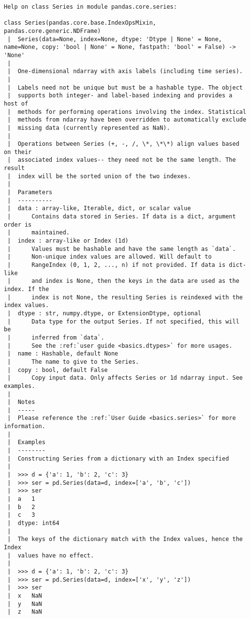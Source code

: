\documentclass[
  letterpaper,
  DIV=11,
  numbers=noendperiod]{scrreprt}
\begin{document}
\begin{verbatim}
Help on class Series in module pandas.core.series:

class Series(pandas.core.base.IndexOpsMixin, pandas.core.generic.NDFrame)
 |  Series(data=None, index=None, dtype: 'Dtype | None' = None, name=None, copy: 'bool | None' = None, fastpath: 'bool' = False) -> 'None'
 |  
 |  One-dimensional ndarray with axis labels (including time series).
 |  
 |  Labels need not be unique but must be a hashable type. The object
 |  supports both integer- and label-based indexing and provides a host of
 |  methods for performing operations involving the index. Statistical
 |  methods from ndarray have been overridden to automatically exclude
 |  missing data (currently represented as NaN).
 |  
 |  Operations between Series (+, -, /, \*, \*\*) align values based on their
 |  associated index values-- they need not be the same length. The result
 |  index will be the sorted union of the two indexes.
 |  
 |  Parameters
 |  ----------
 |  data : array-like, Iterable, dict, or scalar value
 |      Contains data stored in Series. If data is a dict, argument order is
 |      maintained.
 |  index : array-like or Index (1d)
 |      Values must be hashable and have the same length as `data`.
 |      Non-unique index values are allowed. Will default to
 |      RangeIndex (0, 1, 2, ..., n) if not provided. If data is dict-like
 |      and index is None, then the keys in the data are used as the index. If the
 |      index is not None, the resulting Series is reindexed with the index values.
 |  dtype : str, numpy.dtype, or ExtensionDtype, optional
 |      Data type for the output Series. If not specified, this will be
 |      inferred from `data`.
 |      See the :ref:`user guide <basics.dtypes>` for more usages.
 |  name : Hashable, default None
 |      The name to give to the Series.
 |  copy : bool, default False
 |      Copy input data. Only affects Series or 1d ndarray input. See examples.
 |  
 |  Notes
 |  -----
 |  Please reference the :ref:`User Guide <basics.series>` for more information.
 |  
 |  Examples
 |  --------
 |  Constructing Series from a dictionary with an Index specified
 |  
 |  >>> d = {'a': 1, 'b': 2, 'c': 3}
 |  >>> ser = pd.Series(data=d, index=['a', 'b', 'c'])
 |  >>> ser
 |  a   1
 |  b   2
 |  c   3
 |  dtype: int64
 |  
 |  The keys of the dictionary match with the Index values, hence the Index
 |  values have no effect.
 |  
 |  >>> d = {'a': 1, 'b': 2, 'c': 3}
 |  >>> ser = pd.Series(data=d, index=['x', 'y', 'z'])
 |  >>> ser
 |  x   NaN
 |  y   NaN
 |  z   NaN

\end{verbatim}
\end{document}
